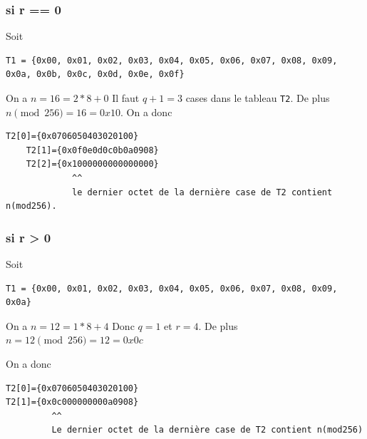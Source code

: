 \documentclass[11pt]{article}
\theoremstyle{definition}
\theoremstyle{definition}
\theoremstyle{definition}
\theoremstyle{theorem}
\theoremstyle{definition}
\begin{document}
\subsubsection{si r == 0}
Soit
\begin{lstlisting}[basicstyle={\scriptsize\ttfamily}, columns={fixed}, frame={}]
  T1 = {0x00, 0x01, 0x02, 0x03, 0x04, 0x05, 0x06, 0x07, 0x08, 0x09, 0x0a, 0x0b, 0x0c, 0x0d, 0x0e, 0x0f}
\end{lstlisting}
    On a $n = 16 = 2*8 + 0$
    Il faut $ q+1 = 3$ cases dans le tableau \texttt{T2}.
    De plus $n \pmod {256} = 16 = 0x10$.
    On a donc
    \begin{lstlisting}[basicstyle={\scriptsize\ttfamily}, columns={fixed}, frame={}]
    T2[0]={0x0706050403020100}
    T2[1]={0x0f0e0d0c0b0a0908}
    T2[2]={0x1000000000000000}
             ^^
             le dernier octet de la dernière case de T2 contient n(mod256).
    \end{lstlisting}
\subsubsection{si r > 0}
Soit
\begin{lstlisting}[basicstyle={\scriptsize\ttfamily}, columns={fixed}, frame={}]
  T1 = {0x00, 0x01, 0x02, 0x03, 0x04, 0x05, 0x06, 0x07, 0x08, 0x09, 0x0a}
\end{lstlisting}
On a $n = 12 = 1*8 +4$
Donc $q = 1$  et  $r = 4$.
De plus $n = 12 \pmod {256} = 12 = 0x0c$

On a donc
\begin{lstlisting}[basicstyle={\scriptsize\ttfamily}, columns={fixed}, frame={}]
T2[0]={0x0706050403020100}
T2[1]={0x0c000000000a0908}
         ^^
         Le dernier octet de la dernière case de T2 contient n(mod256)
\end{lstlisting}
\end{document}
